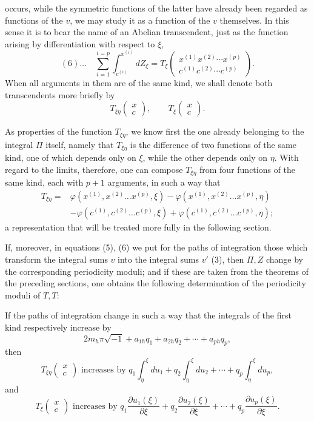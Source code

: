 \documentclass[10pt]{article}
\begin{document}
occurs, while the symmetric functions of the latter have already been regarded as functions of the \(v\), we may study it as a function of the \(v\) themselves. In this sense it is to bear the name of an Abelian transcendent, just as the function arising by differentiation with respect to \(\xi\),
\[
(6)\ldots\quad
\sum_{i=1}^{i=p}\int_{c^{(i)}}^{x^{(i)}}dZ_\xi
=T_\xi\begin{pmatrix}x^{(1)}x^{(2)}\cdots x^{(p)}\\ c^{(1)}c^{(2)}\cdots c^{(p)}\end{pmatrix}.
\]
When all arguments in them are of the same kind, we shall denote both transcendents more briefly by
\[
T_{\xi\eta}\begin{pmatrix}x\\c\end{pmatrix},\qquad
T_\xi\begin{pmatrix}x\\c\end{pmatrix}.
\]

As properties of the function \(T_{\xi\eta}\), we know first the one already belonging to the integral \(\Pi\) itself, namely that \(T_{\xi\eta}\) is the difference of two functions of the same kind, one of which depends only on \(\xi\), while the other depends only on \(\eta\). With regard to the limits, therefore, one can compose \(T_{\xi\eta}\) from four functions of the same kind, each with \(p+1\) arguments, in such a way that
\[
\begin{aligned}
T_{\xi\eta}={}&\varphi(x^{(1)},x^{(2)}\ldots x^{(p)},\xi)
-\varphi(x^{(1)},x^{(2)}\ldots x^{(p)},\eta)\\
&-\varphi(c^{(1)},c^{(2)}\ldots c^{(p)},\xi)
+\varphi(c^{(1)},c^{(2)}\ldots c^{(p)},\eta);
\end{aligned}
\]
a representation that will be treated more fully in the following section.

If, moreover, in equations (5), (6) we put for the paths of integration those which transform the integral sums \(v\) into the integral sums \(v'\) (3), then \(\Pi,Z\) change by the corresponding periodicity moduli; and if these are taken from the theorems of the preceding sections, one obtains the following determination of the periodicity moduli of \(T,T\):

If the paths of integration change in such a way that the integrals of the first kind respectively increase by
\[
2m_h\pi\sqrt{-1}+a_{1h}q_1+a_{2h}q_2+\cdots+a_{ph}q_p,
\]
then
\[
T_{\xi\eta}\begin{pmatrix}x\\c\end{pmatrix}\text{ increases by }
q_1\int_\eta^\xi du_1+q_2\int_\eta^\xi du_2+\cdots+q_p\int_\eta^\xi du_p,
\]
and
\[
T_\xi\begin{pmatrix}x\\c\end{pmatrix}\text{ increases by }
q_1\frac{\partial u_1(\xi)}{\partial\xi}+q_2\frac{\partial u_2(\xi)}{\partial\xi}+\cdots+q_p\frac{\partial u_p(\xi)}{\partial\xi}.
\]
\end{document}
